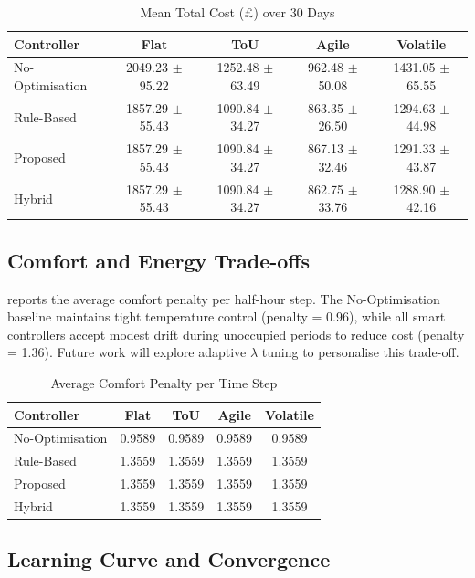 \documentclass[11pt,a4paper]{article}
\begin{document}
\begin{table}[htbp]
\centering
\caption{Mean Total Cost (\pounds) over 30 Days}
\label{tab:absolute_cost}
\begin{tabular}{@{}lcccc@{}}
\toprule
\textbf{Controller} & \textbf{Flat} & \textbf{ToU} & \textbf{Agile} & \textbf{Volatile} \\
\midrule
No-Optimisation & 2049.23 $\pm$ 95.22 & 1252.48 $\pm$ 63.49 & 962.48 $\pm$ 50.08 & 1431.05 $\pm$ 65.55 \\
Rule-Based & 1857.29 $\pm$ 55.43 & 1090.84 $\pm$ 34.27 & 863.35 $\pm$ 26.50 & 1294.63 $\pm$ 44.98 \\
Proposed & 1857.29 $\pm$ 55.43 & 1090.84 $\pm$ 34.27 & 867.13 $\pm$ 32.46 & 1291.33 $\pm$ 43.87 \\
Hybrid & 1857.29 $\pm$ 55.43 & 1090.84 $\pm$ 34.27 & 862.75 $\pm$ 33.76 & 1288.90 $\pm$ 42.16 \\
\bottomrule
\end{tabular}
\end{table}

\subsection{Comfort and Energy Trade-offs}

 reports the average comfort penalty per half-hour step. The No-Optimisation baseline maintains tight temperature control (penalty = 0.96), while all smart controllers accept modest drift during unoccupied periods to reduce cost (penalty = 1.36). Future work will explore adaptive $\lambda$ tuning to personalise this trade-off.

\begin{table}[htbp]
\centering
\caption{Average Comfort Penalty per Time Step}
\label{tab:comfort}
\begin{tabular}{@{}lcccc@{}}
\toprule
\textbf{Controller} & \textbf{Flat} & \textbf{ToU} & \textbf{Agile} & \textbf{Volatile} \\
\midrule
No-Optimisation & 0.9589 & 0.9589 & 0.9589 & 0.9589 \\
Rule-Based & 1.3559 & 1.3559 & 1.3559 & 1.3559 \\
Proposed & 1.3559 & 1.3559 & 1.3559 & 1.3559 \\
Hybrid & 1.3559 & 1.3559 & 1.3559 & 1.3559 \\
\bottomrule
\end{tabular}
\end{table}

\subsection{Learning Curve and Convergence}
\end{document}
